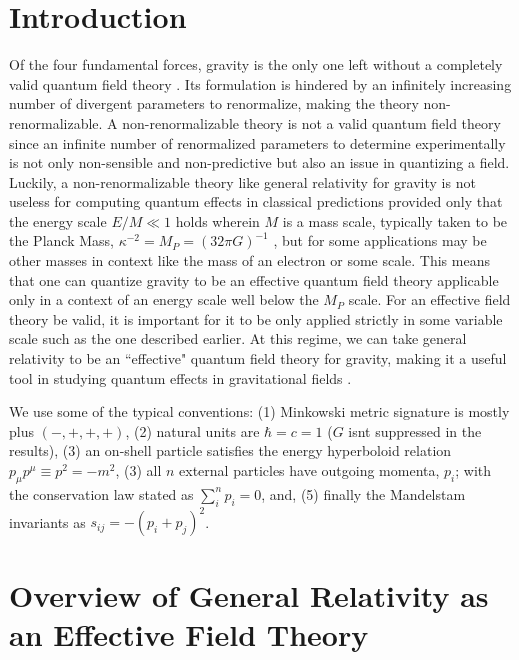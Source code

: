 \documentclass[%
 aip,
rsi,%
 amsmath,amssymb,
 reprint,%
]{revtex4-1}
\begin{document}
\section{Introduction}
\hspace{\parindent}Of the four fundamental forces, gravity is the only one left without a completely valid quantum field theory \cite{zee2010quantum}. Its formulation is hindered by an infinitely increasing number of divergent parameters to renormalize, making the theory non-renormalizable. A non-renormalizable theory is not a valid quantum field theory since an infinite number of renormalized parameters to determine experimentally is not only non-sensible and non-predictive but also an issue in quantizing a field. Luckily, a non-renormalizable theory like general relativity for gravity is not useless for computing quantum effects in classical predictions provided only that the energy scale $E/M\ll 1$ holds wherein $M$ is a mass scale, typically taken to be the Planck Mass, $\kappa^{-2}=M_P=(32\pi G)^{-1}$ , but for some applications may be other masses in context like the mass of an electron or some scale. This means that one can quantize gravity to be an effective quantum field theory applicable only in a context of an energy scale well below the $M_P$ scale. For an effective field theory be valid, it is important for it to be only applied strictly in some variable scale such as the one described earlier. At this regime, we can take general relativity to be an ``effective" quantum field theory for gravity, making it a useful tool in studying quantum effects in gravitational fields \cite{donoghue1994general,bjerrum2003quantum}.
%

We use some of the typical conventions: (1) Minkowski metric signature is mostly plus $(-,+,+,+)$, (2) natural units are $\hbar=c=1$ ($G$ isnt suppressed in the results), (3) an on-shell particle satisfies the energy hyperboloid relation $p_\mu p^\mu\equiv p^2=-m^2$, (3) all $n$ external particles have outgoing momenta, $p_i$; with the conservation law stated as $\sum_{i}^{n}p_i=0$, and, (5) finally the Mandelstam invariants as $s_{ij}=-(p_i+p_j)^2$. 

\section{Overview of General Relativity as an Effective Field Theory}
\end{document}

